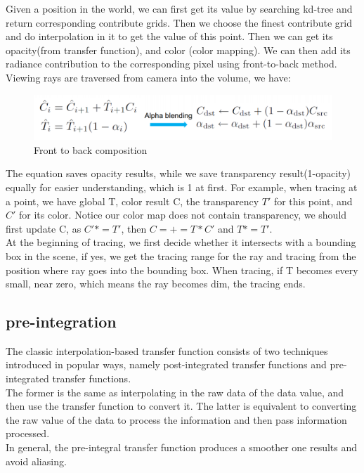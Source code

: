 \documentclass[acmtog]{acmart}
\begin{document}
Given a position in the world, we can first get its value by searching kd-tree and return corresponding contribute grids. Then we choose the finest contribute grid and do interpolation in it to get the value of this point. Then we can get its opacity(from transfer function), and color (color mapping). We can then add its radiance contribution to the corresponding pixel using front-to-back method. Viewing rays are traversed from camera into the volume, we have:
\begin{figure}[h]	
	\centering	
	\includegraphics[width=0.8\linewidth]
	{images/f-1-20-26.png}
	\caption{Front to back composition}
\end{figure}
The equation saves opacity results, while we save transparency result(1-opacity) equally for easier understanding, which is 1 at first. For example, when tracing at a point, we have global T, color result C, the transparency $T'$ for this point, and $C'$ for its color. Notice our color map does not contain transparency, we should first update C, as $C'*=T'$, then $C=+=T*C'$ and $T*=T'$.\\
At the beginning of tracing, we first decide whether it intersects with a bounding box in the scene, if yes, we get the tracing range for the ray and tracing from the position where ray goes into the bounding box. When tracing, if T becomes every small, near zero, which means the ray becomes dim, the tracing ends.


\subsection{pre-integration}
The classic interpolation-based transfer function consists of two
techniques introduced in popular ways, namely post-integrated transfer functions and 
pre-integrated transfer functions.\\
The former is the same as interpolating in the raw data of the data value, and then use 
the transfer function to convert it. The latter is equivalent to converting the raw 
value of the data to process the information and then pass information processed.\\
In general, the pre-integral transfer function produces a smoother one
results and avoid aliasing.\\
\end{document}
